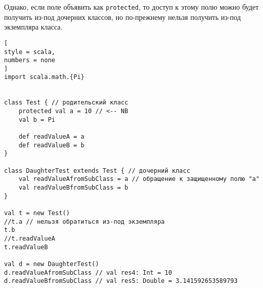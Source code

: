 \documentclass[%
	11pt,
	a4paper,
	utf8,
		]{article}
\begin{document}

Однако, если поле объявить как \texttt{protected}, то доступ к этому полю можно будет получить из-под дочерних классов, но по-прежнему нельзя получить из-под экземпляра класса.
\begin{lstlisting}[
style = scala,
numbers = none	
]
import scala.math.{Pi}


class Test { // родительский класс
	protected val a = 10 // <-- NB
	val b = Pi
	
	def readValueA = a
	def readValueB = b
}

class DaughterTest extends Test { // дочерний класс
	val readValueAfromSubClass = a // обращение к защищенному полю "a"
	val readValueBfromSubClass = b
}

val t = new Test()
//t.a // нельзя обратиться из-под экземпляра
t.b
//t.readValueA
t.readValueB

val d = new DaughterTest()
d.readValueAfromSubClass // val res4: Int = 10
d.readValueBfromSubClass // val res5: Double = 3.141592653589793
\end{lstlisting}




\begin{thebibliography}{99}
	\bibitem{hostmann:scala-2013}{{\emph{Хостаманн К.} Scala для нетерпеливых. -- М.: ДМК Пресс, 2013. -- 408~с. }
\end{thebibliography}
\end{document}
